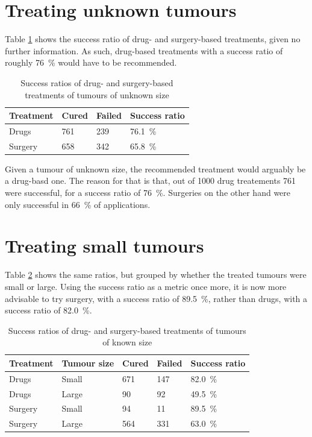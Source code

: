 \documentclass[a4paper]{scrreprt}
\begin{document}
\section{Treating unknown tumours}

Table \ref{tbl:treating_unknown_tumours} shows the success ratio of drug- and
surgery-based treatments, given no further information. As such, drug-based
treatments with a success ratio of roughly \SI{76}{\percent} would have to be
recommended.

\begin{table}
		\centering
		\begin{tabular}{llll}
				\toprule
				Treatment & Cured & Failed & Success ratio \\
				\midrule
				Drugs   & 761     & 239    &    \SI{76.1}{\percent} \\
				Surgery & 658     & 342    &    \SI{65.8}{\percent} \\
				\bottomrule
		\end{tabular}
		\caption{Success ratios of drug- and surgery-based treatments of tumours of unknown size}
		\label{tbl:treating_unknown_tumours}
\end{table}

Given a tumour of unknown size, the recommended treatment would arguably be a
drug-basd one. The reason for that is that, out of 1000 drug treatements
761 were successful, for a success ratio of \SI{76}{\percent}. Surgeries on the
other hand were only successful in \SI{66}{\percent} of applications.

\section{Treating small tumours}

Table \ref{tbl:treating_tumours_known_size} shows the same ratios, but grouped
by whether the treated tumours were small or large. Using the success ratio as
a metric once more, it is now more advisable to try surgery, with a success
ratio of \SI{89.5}{\percent}, rather than drugs, with a success ratio of
\SI{82.0}{\percent}.

\begin{table}
		\centering
		\begin{tabular}{lllll}
				\toprule
				Treatment & Tumour size & Cured & Failed & Success ratio \\
				\midrule
				Drugs     & Small       & 671   & 147    &    \SI{82.0}{\percent} \\
				Drugs     & Large       & 90    & 92     &    \SI{49.5}{\percent} \\
				Surgery   & Small       & 94    & 11     &    \SI{89.5}{\percent} \\
				Surgery   & Large       & 564   & 331    &    \SI{63.0}{\percent} \\
				\bottomrule
		\end{tabular}
		\caption{Success ratios of drug- and surgery-based treatments of tumours of known size}
		\label{tbl:treating_tumours_known_size}
\end{table}
\end{document}
